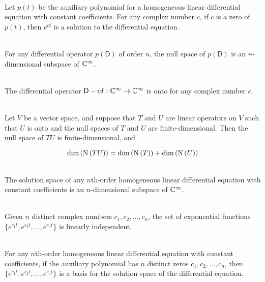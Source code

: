 \begin{theorem}
	\hfill\\
	Let $p(t)$ be the auxiliary polynomial for a homogeneous linear differential equation with constant coefficients. For any complex number $c$, if $c$ is a zero of $p(t)$, then $e^{ct}$ is a solution to the differential equation.
\end{theorem}

\begin{theorem}
	\hfill\\
	For any differential operator $p(\mathsf{D})$ of order $n$, the null space of $p(\mathsf{D})$ is an $n$-dimensional subspace of $\mathbb{C}^\infty$.
\end{theorem}

\begin{lemma}
	\hfill\\
	The differential operator $\mathsf{D} - cI: \mathbb{C}^\infty \to \mathbb{C}^\infty$ is onto for any complex number $c$.
\end{lemma}

\begin{lemma}
	\hfill\\
	Let $V$ be a vector space, and suppose that $T$ and $U$ are linear operators on $V$ such that $U$ is onto and the null spaces of $T$ and $U$ are finite-dimensional. Then the null space of $TU$ is finite-dimensional, and

	\[\text{dim}\left(\text{N}\left(TU\right)\right) = \text{dim}\left(\text{N}\left(T\right)\right) + \text{dim}\left(\text{N}\left(U\right)\right)\]
\end{lemma}

\begin{corollary}
	\hfill\\
	The solution space of any $n$th-order homogeneous linear differential equation with constant coefficients is an $n$-dimensional subspace of $\mathbb{C}^\infty$.
\end{corollary}

\begin{theorem}
	\hfill\\
	Given $n$ distinct complex numbers $c_1, c_2, \dots, c_n$, the set of exponential functions $\{e^{c_1t},e^{c_2t},\dots,e^{c_nt}\}$ is linearly independent.
\end{theorem}

\begin{corollary}
	\hfill\\
	For any $n$th-order homogeneous linear differential equation with constant coefficients, if the auxiliary polynomial has $n$ distinct zeros $c_1, c_2, \dots, c_n$, then $\{e^{c_1t}, e^{c_2t}, \dots, e^{c_nt}\}$ is a basis for the solution space of the differential equation.
\end{corollary}

